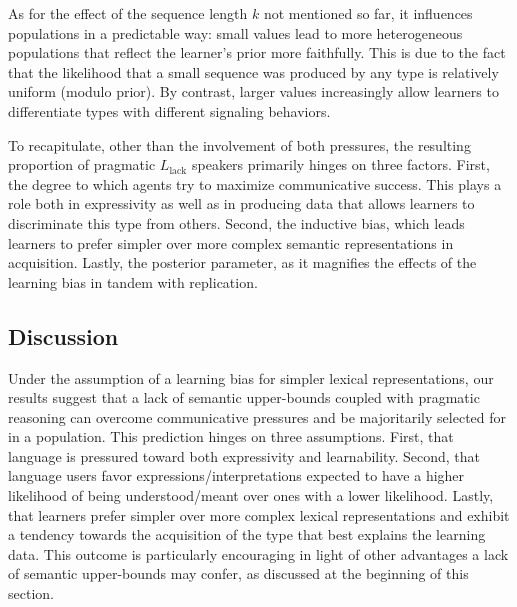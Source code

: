 \documentclass[a4paper]{article}
\newcommand{\mylang}[1]{\ensuremath{L_{\text{#1}}}\xspace} %
\newcommand{\Llack}{\mylang{lack}}
\begin{document}
As for the effect of the sequence length $k$ not mentioned so far, it influences populations in a predictable way: small values lead to more heterogeneous populations that reflect the learner's prior more faithfully. This is due to the fact that the likelihood that a small sequence was produced by any type is relatively uniform (modulo prior). By contrast, larger values increasingly allow learners to differentiate types with different signaling behaviors.

To recapitulate, other than the involvement of both pressures, the resulting proportion of pragmatic $\Llack$ speakers primarily hinges on three factors. First, the degree to which agents try to maximize communicative success. This plays a role both in expressivity as well as in producing data that allows learners to discriminate this type from others. Second, the inductive bias, which leads learners to prefer simpler over more complex semantic representations in acquisition. Lastly, the posterior parameter, as it magnifies the effects of the learning bias in tandem with replication. 




\subsection{Discussion}
Under the assumption of a learning bias for simpler lexical representations, our results suggest that a lack of semantic upper-bounds coupled with pragmatic reasoning can overcome communicative pressures and be majoritarily selected for in a population. This prediction hinges on three assumptions. First, that language is pressured toward both expressivity and learnability. Second, that language users favor expressions/interpretations expected to have a higher likelihood of being understood/meant over ones with a lower likelihood. Lastly, that learners prefer simpler over more complex lexical representations and exhibit a tendency towards the acquisition of the type that best explains the learning data. This outcome is particularly encouraging in light of other advantages a lack of semantic upper-bounds may confer, as discussed at the beginning of this section.
\end{document}
